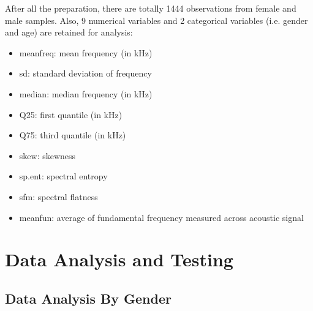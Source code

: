 \documentclass{article}
\begin{document}
	After all the preparation, there are totally 1444 observations from female and male samples. Also, 9 numerical variables and 2 categorical variables (i.e. gender and age) are retained for analysis:
	
	\begin{itemize}
		\item meanfreq: mean frequency (in kHz)
		\item sd: standard deviation of frequency
		\item median: median frequency (in kHz)
		\item Q25: first quantile (in kHz)
		\item Q75: third quantile (in kHz)
		\item skew: skewness
		\item sp.ent: spectral entropy
		\item sfm: spectral flatness
		\item meanfun: average of fundamental frequency measured across acoustic signal
	\end{itemize}
	
	
	\section{Data Analysis and Testing}
	
	\subsection{Data Analysis By Gender}
	
\end{document}
